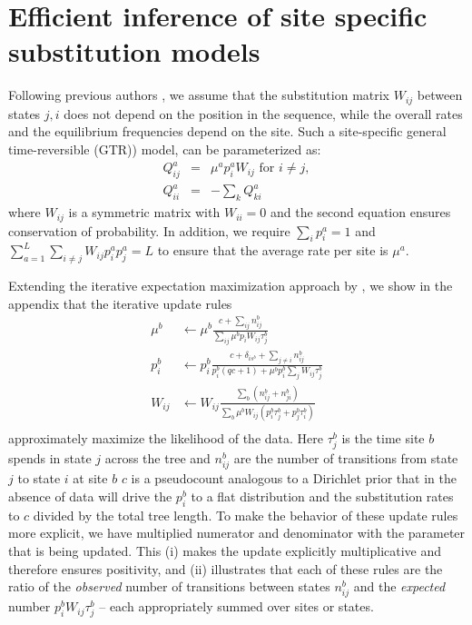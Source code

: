 \documentclass[aps,rmp,twocolumn]{revtex4}
\newcommand{\eqp}{p}
\newcommand{\pc}{c}
\begin{document}
\section*{Efficient inference of site specific substitution models}
Following previous authors \citet{halpern_evolutionary_1998}, we assume that the substitution matrix $W_{ij}$ between states $j,i$ does not depend on the position in the sequence, while
the overall rates and the equilibrium frequencies depend on the site.
Such a site-specific general time-reversible (GTR)) model, can be parameterized as:
\begin{eqnarray}
Q^{a}_{ij} &=& \mu^{a}\eqp^{a}_{i} W_{ij} \textrm{ for } i\neq j,\nonumber \\
Q^{a}_{ii} &=& -\sum_k Q^{a}_{ki}
\label{eq:Qij}
\end{eqnarray}
where $W_{ij}$ is a symmetric matrix with $W_{ii}=0$ and the second equation ensures conservation of probability.
In addition, we require $\sum_i \eqp^{a}_i = 1$ and $\sum_{a=1}^L\sum_{i\neq j}W_{ij}p^{a}_ip^{a}_j=L$ to ensure that the average rate per site is $\mu^{a}$.

Extending the iterative expectation maximization approach by \citet{bruno1996modeling}, we show in the appendix that the iterative update rules
\begin{equation}
\label{eq:update}
	\begin{split}
		\mu^b & \leftarrow \mu^b\frac{\pc+\sum_{ij} n^b_{ij}}{\sum_{ij}\mu^b \eqp_{i}W_{ij}\tau_j^b} \\
		\eqp^b_i & \leftarrow \eqp^b_i\frac{\pc+\delta_{is^{b}} + \sum_{j\neq i} n^b_{ij}}{\eqp^b_i(q\pc+1) + \mu^b\eqp^b_i \sum_{j}W_{ij}\tau_j^b} \\
		W_{ij} & \leftarrow W_{ij}\frac{\sum_b (n^b_{ij}+n^b_{ji})}{\sum_b \mu^b W_{ij}(\eqp_i^b\tau_j^b + \eqp_j^b \tau_i^b)} \\
	\end{split}
\end{equation}
approximately maximize the likelihood of the data.
Here $\tau^b_j$ is the time site $b$ spends in state $j$ across the tree and $n^b_{ij}$ are the number of transitions from state $j$ to state $i$ at site $b$
$\pc$ is a pseudocount analogous to a Dirichlet prior that in the absence of data will drive the $\eqp_i^b$ to a flat distribution and the substitution rates to $\pc$ divided by the total tree length.
To make the behavior of these update rules more explicit, we have multiplied numerator and denominator with the parameter that is being updated. This (i) makes the update explicitly multiplicative and therefore ensures positivity, and (ii) illustrates that each of these rules are the ratio of the {\it observed} number of transitions between states $n^b_{ij}$ and the {\it expected} number $\eqp^b_i W_{ij}\tau_j^b$ -- each appropriately summed over sites or states.
\end{document}
